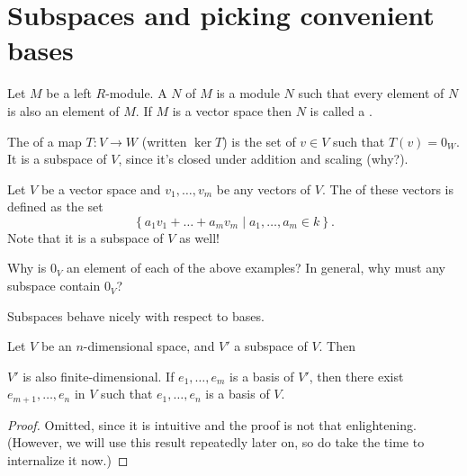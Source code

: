 \section{Subspaces and picking convenient bases}
\begin{definition}
	Let $M$ be a left $R$-module.
	A  $N$ of $M$ is a module $N$
	such that every element of $N$ is also an element of $M$.
	If $M$ is a vector space then $N$ is called a .
\end{definition}

\begin{example}[Kernels]
	The  of a map $T \colon V \to W$ (written $\ker T$) is
	the set of $v \in V$ such that $T(v) = 0_W$.
	It is a subspace of $V$, since it's closed under addition and scaling (why?).
\end{example}
\begin{example}[Spans]
	Let $V$ be a vector space and $v_1, \dots, v_m$ be any vectors of $V$.
	The  of these vectors is defined as the set
	\[ \left\{ a_1 v_1 + \dots + a_m v_m \mid a_1, \dots, a_m \in k \right\}. \]
	Note that it is a subspace of $V$ as well!
\end{example}
\begin{ques}
	Why is $0_V$ an element of each of the above examples?
	In general, why must any subspace contain $0_V$?
\end{ques}

Subspaces behave nicely with respect to bases.
\begin{theorem}
	\label{thm:basis_completion}
	Let $V$ be an $n$-dimensional space, and $V'$ a subspace of $V$.
	Then
	\begin{enumerate}[(a)]
		\ii $V'$ is also finite-dimensional.
		\ii If $e_1, \dots, e_m$ is a basis of $V'$, then there exist
		$e_{m+1}, \dots, e_n$ in $V$ such that
		$e_1, \dots, e_n$ is a basis of $V$.
	\end{enumerate}
\end{theorem}
\begin{proof}
	Omitted, since it is intuitive and the proof is not that enlightening.
	(However, we will use this result repeatedly later on,
	so do take the time to internalize it now.)
\end{proof}

